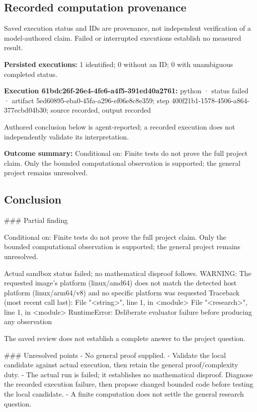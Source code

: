 \documentclass[11pt]{article}
\begin{document}
\subsection{Recorded computation provenance}
Saved execution status and IDs are provenance, not independent verification of a model-authored claim. Failed or interrupted executions establish no measured result.\par
\textbf{Persisted executions:} 1 identified; 0 without an ID; 0 with unambiguous completed status.\par
\textbf{Execution 61bdc26f-26e4-4fe6-a4f5-391ed40a2761:} python · status failed · artifact 5ed60895-eba0-45fa-a296-ef06e8c8e359; step 400f21b1-1578-4506-a864-377ecbd04b30; source recorded, output recorded\par
Authored conclusion below is agent-reported; a recorded execution does not independently validate its interpretation.\par
\textbf{Outcome summary:} Conditional on: Finite tests do not prove the full project claim. Only the bounded computational observation is supported; the general project remains unresolved.\par
\subsection{Conclusion}
\#\#\# Partial finding

Conditional on: Finite tests do not prove the full project claim. Only the bounded computational observation is supported; the general project remains unresolved.

Actual sandbox status failed; no mathematical disproof follows. WARNING: The requested image's platform (linux/amd64) does not match the detected host platform (linux/arm64/v8) and no specific platform was requested
Traceback (most recent call last):
  File "\textless{}string\textgreater{}", line 1, in \textless{}module\textgreater{}
  File "\textless{}research\textgreater{}", line 1, in \textless{}module\textgreater{}
RuntimeError: Deliberate evaluator failure before producing any observation

The saved review does not establish a complete answer to the project question.

\#\#\# Unresolved points
- No general proof supplied.
- Validate the local candidate against actual execution, then retain the general proof/complexity duty.
- The actual run is failed; it establishes no mathematical disproof. Diagnose the recorded execution failure, then propose changed bounded code before testing the local candidate.
- A finite computation does not settle the general research question.
\end{document}
